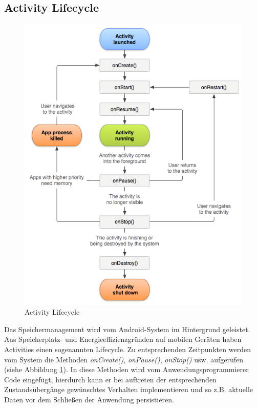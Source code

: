 \subsection{Activity Lifecycle}
\label{sec:activity_lifecycle}
\begin{figure}[ht]
\centering
\includegraphics[width=\textwidth]{../img/ActivityLifecycle.png}
\caption{Activity Lifecycle}
\label{fig:activitylifecycle}
\end{figure}

Das Speichermanagement wird vom Android-System im Hintergrund geleistet. Aus Speicherplatz- und Energieeffizienzgründen auf mobilen Geräten haben Activities einen sogenannten Lifecycle. Zu entsprechenden Zeitpunkten werden vom System die Methoden \emph{onCreate()}, \emph{onPause()}, \emph{onStop()} usw. aufgerufen (siehe Abbildung \ref{fig:activitylifecycle}). In diese Methoden wird vom Anwendungsprogrammierer Code eingefügt, hierdurch kann er bei auftreten der entsprechenden Zustandsübergänge gewünschtes Verhalten implementieren und so z.B. aktuelle Daten vor dem Schließen der Anwendung persistieren.

